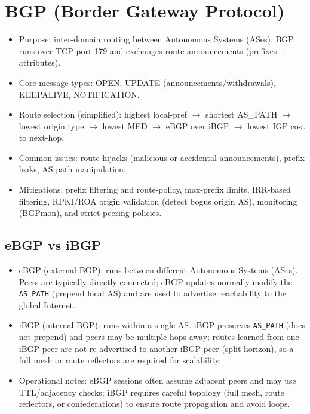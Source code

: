 \documentclass[12pt]{article}
\begin{document}
\section{BGP (Border Gateway Protocol)}
\begin{itemize}
  \item Purpose: inter-domain routing between Autonomous Systems (ASes). BGP runs over TCP port 179 and exchanges route announcements (prefixes + attributes).
  \item Core message types: OPEN, UPDATE (announcements/withdrawals), KEEPALIVE, NOTIFICATION.
  \item Route selection (simplified): highest local-pref $\to$ shortest AS\_PATH $\to$ lowest origin type $\to$ lowest MED $\to$ eBGP over iBGP $\to$ lowest IGP cost to next-hop.
  \item Common issues: route hijacks (malicious or accidental announcements), prefix leaks, AS path manipulation.
  \item Mitigations: prefix filtering and route-policy, max-prefix limits, IRR-based filtering, RPKI/ROA origin validation (detect bogus origin AS), monitoring (BGPmon), and strict peering policies.
\end{itemize}

\subsection{eBGP vs iBGP}
\begin{itemize}
  \item eBGP (external BGP): runs between different Autonomous Systems (ASes). Peers are typically directly connected; eBGP updates normally modify the \texttt{AS\_PATH} (prepend local AS) and are used to advertise reachability to the global Internet.
  \item iBGP (internal BGP): runs within a single AS. iBGP preserves \texttt{AS\_PATH} (does not prepend) and peers may be multiple hops away; routes learned from one iBGP peer are not re-advertised to another iBGP peer (split-horizon), so a full mesh or route reflectors are required for scalability.
  \item Operational notes: eBGP sessions often assume adjacent peers and may use TTL/adjacency checks; iBGP requires careful topology (full mesh, route reflectors, or confederations) to ensure route propagation and avoid loops.
\end{itemize}
\end{document}
